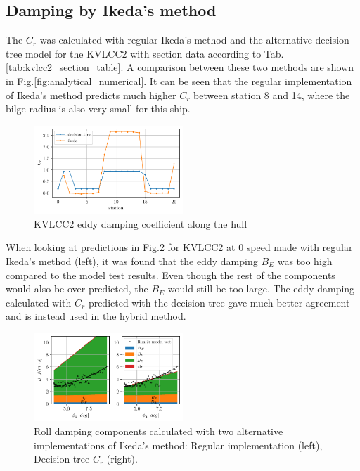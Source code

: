 \subsection*{Damping by Ikeda's method}\label{damping-by-ikedas-method}
The $C_r$ was calculated with regular Ikeda's method and the
alternative decision tree model for the KVLCC2 with section data
according to Tab.\ref{tab:kvlcc2_section_table}. A comparison
between these two methods are shown in
Fig.\ref{fig:analytical_numerical}. It can be seen that the
regular implementation of Ikeda's method predicts much higher $C_r$
between station 8 and 14, where the bilge radius is also very small for
this ship.
\begin{figure}[H]
\begin{center}\includegraphics[width = 0.5\textwidth]{figures/kvlcc2_eddy.pdf}\end{center}
\vspace{-1cm}
\caption{KVLCC2 eddy damping coefficient along the hull}
\label{fig:kvlcc2_eddy}
\end{figure}
When looking at predictions in Fig.\ref{fig:ikeda} for KVLCC2 at
0 speed made with regular Ikeda's method (left), it was found that the
eddy damping $B_E$ was too high compared to the model test results.
Even though the rest of the components would also be over predicted, the
$B_E$ would still be too large. The eddy damping calculated with
$C_r$ predicted with the decision tree gave much better agreement and
is instead used in the hybrid method.
\begin{figure}[H]
\begin{center}\includegraphics[width = 0.5\textwidth]{figures/ikeda.pdf}\end{center}
\vspace{-1cm}
\caption{Roll damping components calculated with two alternative implementations of Ikeda's method: Regular implementation (left), Decision tree $C_r$ (right).}
\label{fig:ikeda}
\end{figure}

